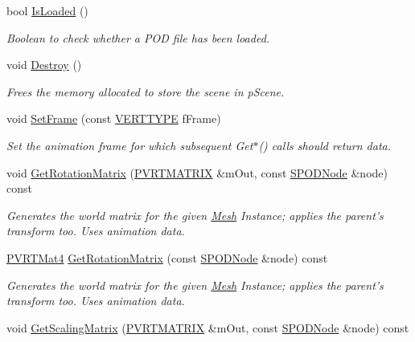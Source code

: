 \begin{DoxyCompactItemize}
bool \hyperlink{class_c_p_v_r_t_model_p_o_d_a14547b77b10b6e6d97c92b6ce0020705}{Is\+Loaded} ()
\begin{DoxyCompactList}\small\item\em Boolean to check whether a P\+O\+D file has been loaded. \end{DoxyCompactList}\item 
void \hyperlink{class_c_p_v_r_t_model_p_o_d_a8a15860a44e4ad22d3c486e17e89226c}{Destroy} ()
\begin{DoxyCompactList}\small\item\em Frees the memory allocated to store the scene in p\+Scene. \end{DoxyCompactList}\item 
void \hyperlink{class_c_p_v_r_t_model_p_o_d_a52258e72054fcc086efc2374648e141d}{Set\+Frame} (const \hyperlink{group___a_p_i___o_g_l_e_s_ga06da457b7d3e93368ab904f89e1396be}{V\+E\+R\+T\+T\+Y\+P\+E} f\+Frame)
\begin{DoxyCompactList}\small\item\em Set the animation frame for which subsequent Get$\ast$() calls should return data. \end{DoxyCompactList}\item 
void \hyperlink{class_c_p_v_r_t_model_p_o_d_a021fd16d1c7d7f3e09ba1e133289d0e7}{Get\+Rotation\+Matrix} (\hyperlink{class_p_v_r_t_m_a_t_r_i_xf}{P\+V\+R\+T\+M\+A\+T\+R\+I\+X} \&m\+Out, const \hyperlink{struct_s_p_o_d_node}{S\+P\+O\+D\+Node} \&node) const 
\begin{DoxyCompactList}\small\item\em Generates the world matrix for the given \hyperlink{class_mesh}{Mesh} Instance; applies the parent's transform too. Uses animation data. \end{DoxyCompactList}\item 
\hyperlink{struct_p_v_r_t_mat4}{P\+V\+R\+T\+Mat4} \hyperlink{class_c_p_v_r_t_model_p_o_d_a515c34b5a0285ee713d97541eb082496}{Get\+Rotation\+Matrix} (const \hyperlink{struct_s_p_o_d_node}{S\+P\+O\+D\+Node} \&node) const 
\begin{DoxyCompactList}\small\item\em Generates the world matrix for the given \hyperlink{class_mesh}{Mesh} Instance; applies the parent's transform too. Uses animation data. \end{DoxyCompactList}\item 
void \hyperlink{class_c_p_v_r_t_model_p_o_d_aaf982331192d8590949796dd61777c8a}{Get\+Scaling\+Matrix} (\hyperlink{class_p_v_r_t_m_a_t_r_i_xf}{P\+V\+R\+T\+M\+A\+T\+R\+I\+X} \&m\+Out, const \hyperlink{struct_s_p_o_d_node}{S\+P\+O\+D\+Node} \&node) const 

\end{DoxyCompactItemize}
